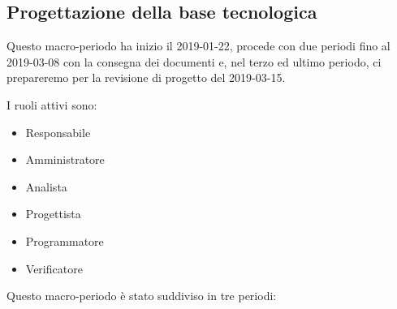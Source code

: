 		\newpage

        \subsection{Progettazione della base tecnologica}\label{PianificazioneBaseTecnologica}
		Questo macro-periodo ha inizio il 2019-01-22, procede con due periodi fino al 2019-03-08 con la consegna
		dei documenti e, nel terzo ed ultimo periodo, ci prepareremo per la revisione di progetto del 2019-03-15.

        I ruoli attivi sono:
        \begin{itemize}
            \item Responsabile
            \item Amministratore
            \item Analista
            \item Progettista
            \item Programmatore
            \item Verificatore
        \end{itemize}
        Questo macro-periodo è stato suddiviso in tre periodi:
